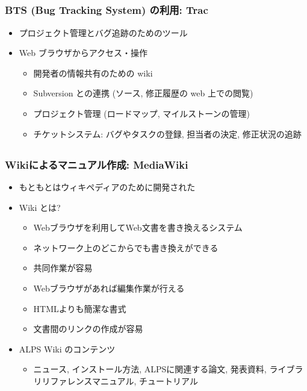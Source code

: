 \subsection*{\redm\whitem\greenb}
\begin{frame}
  \frametitle{BTS (Bug Tracking System) の利用: Trac}
  \begin{itemize}
    \setlength{\itemsep}{1em}
  \item プロジェクト管理とバグ追跡のためのツール
  \item Web ブラウザからアクセス・操作
    \begin{itemize}
    \item 開発者の情報共有のための wiki
    \item Subversion との連携 (ソース, 修正履歴の web 上での閲覧)
    \item プロジェクト管理 (ロードマップ, マイルストーンの管理)
    \item チケットシステム: バグやタスクの登録, 担当者の決定, 修正状況の追跡
    \end{itemize}
  \end{itemize}
\end{frame}

\subsection*{\redm\whitem\greenb}
\begin{frame}
  \frametitle{Wikiによるマニュアル作成: MediaWiki}
  \begin{itemize}
  \item もともとはウィキペディアのために開発された
  \item Wiki とは?
    \begin{itemize}
    \item Webブラウザを利用してWeb文書を書き換えるシステム
    \item ネットワーク上のどこからでも書き換えができる
    \item 共同作業が容易
    \item Webブラウザがあれば編集作業が行える
    \item HTMLよりも簡潔な書式
    \item 文書間のリンクの作成が容易
    \end{itemize}
  \item ALPS Wiki のコンテンツ
    \begin{itemize}
    \item ニュース, インストール方法, ALPSに関連する論文, 発表資料, ライブラリリファレンスマニュアル, チュートリアル
    \end{itemize}
  \end{itemize}
\end{frame}

